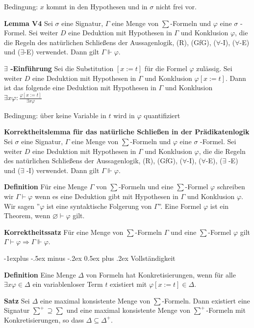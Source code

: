 \documentclass[a4paper]{article}
\makeatletter
\renewcommand{\note}[2]{\begin{noteBox} \textbf{#1} #2 \end{noteBox}}
\renewcommand{\subsection}{\@startsection{subsection}{2}{0mm}%
                {-1explus -.5ex minus -.2ex}%
                {0.5ex plus .2ex}%
                {\normalfont\normalsize\bfseries}}
\makeatother
\begin{document}
\begin{multicols}{3}
{    Bedingung: $x$ kommt in den Hypothesen und in $\sigma$ nicht frei vor.}

  \note{Lemma V4}{Sei $\sigma$ eine Signatur, $\Gamma$ eine Menge von $\sum$-Formeln und $\varphi$ eine $\sigma$ -Formel. Sei weiter $D$ eine Deduktion mit Hypothesen in $\Gamma$ und Konklusion $\varphi$, die die Regeln des natürlichen Schließens der Aussagenlogik, (R), (GfG), ($\forall$-I), ($\forall$-E) und ($\exists$-E) verwendet. Dann gilt $\Gamma\Vdash\varphi$.}

  \note{$\exists$ -Einführung}{Sei die Substitution $[x:=t]$ für die Formel $\varphi$ zulässig. Sei weiter $D$ eine Deduktion mit Hypothesen in $\Gamma$ und Konklusion $\varphi[x:=t]$. Dann ist das folgende eine Deduktion mit Hypothesen in $\Gamma$ und Konklusion $\exists x\varphi:\frac{\varphi[x:=t]}{\exists x\varphi}$

    Bedingung: über keine Variable in $t$ wird in $\varphi$ quantifiziert}

  \note{Korrektheitslemma für das natürliche Schließen in der Prädikatenlogik}{
    Sei $\sigma$ eine Signatur, $\Gamma$ eine Menge von $\sum$-Formeln und $\varphi$ eine $\sigma$ -Formel.
    Sei weiter $D$ eine Deduktion mit Hypothesen in $\Gamma$ und Konklusion $\varphi$, die die Regeln des natürlichen Schließens der Aussagenlogik, (R), (GfG), ($\forall$-I), ($\forall$-E), ($\exists$ -E) und ($\exists$ -I) verwendet. Dann gilt $\Gamma\Vdash\varphi$.}

  \note{Definition}{Für eine Menge $\Gamma$ von $\sum$-Formeln und eine $\sum$-Formel $\varphi$ schreiben wir $\Gamma\vdash\varphi$ wenn es eine Deduktion gibt mit Hypothesen in $\Gamma$ und Konklusion $\varphi$. Wir sagen ''$\varphi$ ist eine syntaktische Folgerung von $\Gamma$''.
    Eine Formel $\varphi$ ist ein Theorem, wenn $\varnothing\vdash\varphi$ gilt.}

  \note{Korrektheitssatz}{Für eine Menge von $\sum$-Formeln $\Gamma$ und eine $\sum$-Formel $\varphi$ gilt $\Gamma\vdash\varphi \Rightarrow \Gamma\Vdash\varphi$.}

  \subsection{Vollständigkeit}

  \note{Definition}{Eine Menge $\Delta$ von Formeln hat Konkretisierungen, wenn für alle $\exists x\varphi\in\Delta$ ein variablenloser Term $t$ existiert mit $\varphi[x:=t]\in\Delta$.}

  \note{Satz}{Sei $\Delta$ eine maximal konsistente Menge von $\sum$-Formeln. Dann existiert eine Signatur $\sum^+ \supseteq\sum$ und eine maximal konsistente Menge von $\sum^+$-Formeln mit Konkretisierungen, so dass $\Delta\subseteq\Delta^+$.}


\end{multicols}
\end{document}
